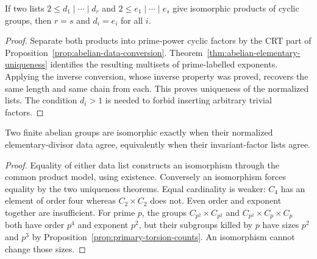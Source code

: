 \begin{theorem}\label{thm:abelian-invariant-uniqueness}
If two lists $2\leq d_1\mid\cdots\mid d_r$ and $2\leq e_1\mid\cdots\mid e_s$ give isomorphic products of cyclic groups, then $r=s$ and $d_i=e_i$ for all $i$.
\end{theorem}
\begin{proof}
Separate both products into prime-power cyclic factors by the CRT part of Proposition~\ref{prop:abelian-data-conversion}. Theorem~\ref{thm:abelian-elementary-uniqueness} identifies the resulting multisets of prime-labelled exponents. Applying the inverse conversion, whose inverse property was proved, recovers the same length and same chain from each. This proves uniqueness of the normalized lists. The condition $d_i>1$ is needed to forbid inserting arbitrary trivial factors.
\end{proof}

\begin{corollary}\label{cor:abelian-isomorphism-test}
Two finite abelian groups are isomorphic exactly when their normalized elementary-divisor data agree, equivalently when their invariant-factor lists agree.
\end{corollary}
\begin{proof}
Equality of either data list constructs an isomorphism through the common product model, using existence. Conversely an isomorphism forces equality by the two uniqueness theorems. Equal cardinality is weaker: $C_4$ has an element of order four whereas $C_2\times C_2$ does not. Even order and exponent together are insufficient. For prime $p$, the groups $C_{p^2}\times C_{p^2}$ and $C_{p^2}\times C_p\times C_p$ both have order $p^4$ and exponent $p^2$, but their subgroups killed by $p$ have sizes $p^2$ and $p^3$ by Proposition~\ref{prop:primary-torsion-counts}. An isomorphism cannot change those sizes.
\end{proof}

